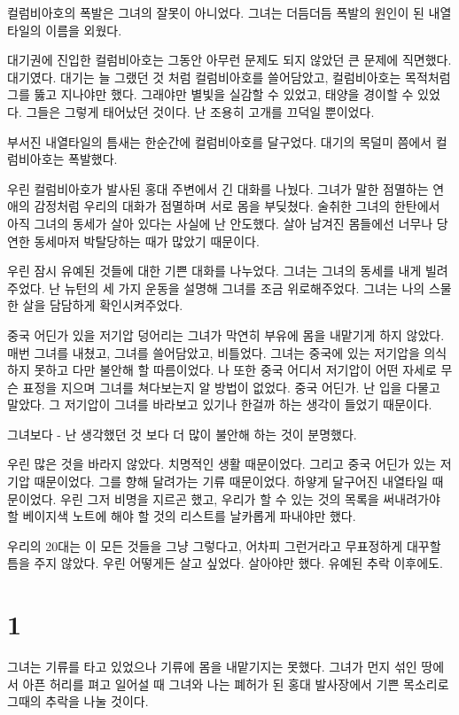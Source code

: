 \documentclass[a5paper,10pt, twoside, openright]{memoir}
\begin{document}
	컬럼비아호의 폭발은 그녀의 잘못이 아니었다. 그녀는 더듬더듬 폭발의 원인이 된 내열타일의 이름을 외웠다.

	대기권에 진입한 컬럼비아호는 그동안 아무런 문제도 되지 않았던 큰 문제에 직면했다. 대기였다. 대기는 늘 그랬던 것 처럼 컬럼비아호를 쓸어담았고, 컬럼비아호는 목적처럼 그를 뚫고 지나야만 했다. 그래야만 별빛을 실감할 수 있었고, 태양을 경이할 수 있었다.  그들은 그렇게 태어났던 것이다. 난 조용히 고개를 끄덕일 뿐이었다.

	부서진 내열타일의 틈새는 한순간에 컬럼비아호를 달구었다. 대기의 목덜미 쯤에서 컬럼비아호는 폭발했다.

	우린 컬럼비아호가 발사된 홍대 주변에서 긴 대화를 나눴다. 그녀가 말한 점멸하는 연애의 감정처럼 우리의 대화가 점멸하며 서로 몸을 부딪쳤다. 술취한 그녀의 한탄에서 아직 그녀의 동세가 살아 있다는 사실에 난 안도했다. 살아 남겨진 몸들에선 너무나 당연한 동세마저 박탈당하는 때가 많았기 때문이다.

	우린 잠시 유예된 것들에 대한 기쁜 대화를 나누었다. 그녀는 그녀의 동세를 내게 빌려주었다. 난 뉴턴의 세 가지 운동을 설명해 그녀를 조금 위로해주었다. 그녀는 나의 스물한 살을 담담하게 확인시켜주었다.

	중국 어딘가 있을 저기압 덩어리는 그녀가 막연히 부유에 몸을 내맡기게 하지 않았다.
	매번 그녀를 내쳤고, 그녀를 쓸어담았고, 비틀었다. 그녀는 중국에 있는 저기압을 의식하지 못하고 다만 불안해 할 따름이었다. 나 또한 중국 어디서 저기압이 어떤 자세로 무슨 표정을 지으며 그녀를 쳐다보는지 알 방법이 없었다. 중국 어딘가. 난 입을 다물고 말았다. 그 저기압이 그녀를 바라보고 있기나 한걸까 하는 생각이 들었기 때문이다.

	그녀보다 - 난 생각했던 것 보다 더 많이 불안해 하는 것이 분명했다.

	우린 많은 것을 바라지 않았다. 치명적인 생활 때문이었다. 그리고 중국 어딘가 있는 저기압 때문이었다. 그를 향해 달려가는 기류 때문이었다. 하얗게 달구어진 내열타일 때문이었다. 우린 그저 비명을 지르곤 했고, 우리가 할 수 있는 것의 목록을 써내려가야 할 베이지색 노트에 해야 할 것의 리스트를 날카롭게 파내야만 했다.

	우리의 20대는 이 모든 것들을 그냥 그렇다고, 어차피 그런거라고 무표정하게 대꾸할 틈을 주지 않았다. 우린 어떻게든 살고 싶었다. 살아야만 했다. 유예된 추락 이후에도.

				\section{1}
	그녀는 기류를 타고 있었으나 기류에 몸을 내맡기지는 못했다. 그녀가 먼지 섞인 땅에서 아픈 허리를 펴고 일어설 때 그녀와 나는 폐허가 된 홍대 발사장에서 기쁜 목소리로 그때의 추락을 나눌 것이다.
	
\end{document}
